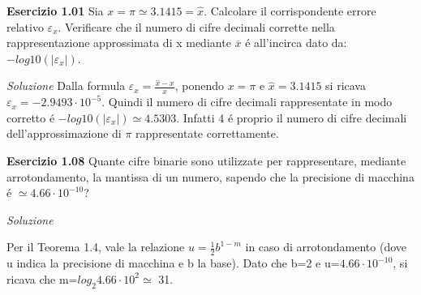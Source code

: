 \documentclass[20pt,a4paper]{book}
\begin{document}
 
\textbf{\Large{Esercizio 1.01}}
Sia \begin{math}{x=\pi\simeq 3.1415=\widehat{x}}\end{math}. Calcolare il corrispondente errore
relativo \begin{math}{\varepsilon_{x}}\end{math}. Verificare che il numero di cifre decimali 
corrette nella rappresentazione approssimata di x mediante \begin{math}{\overline{x}}\end{math}
\'e all'incirca dato da: \begin{math}{-log10(|\varepsilon_{x}|)}\end{math}.

\textit{Soluzione}
Dalla formula \begin{math}{\varepsilon_{x}=\frac{\widehat{x}-x}{x}}\end{math}, ponendo \begin{math}
{x=\pi}\end{math} e \begin{math}{\widehat{x}=3.1415}\end{math} si ricava \begin{math}{\varepsilon_{x}=
-2.9493\cdot10^{-5}}\end{math}. Quindi il numero di cifre decimali rappresentate in modo corretto \'e \begin{math}{-log10(|\varepsilon_{x}|)\simeq 4.5303}\end{math}. 
Infatti 4 \'e proprio il numero di cifre decimali dell'approssimazione di \begin{math}{\pi}\end{math} rappresentate correttamente.

 
\vspace{10mm}

\textbf{\Large{Esercizio 1.08}}
Quante cifre binarie sono utilizzate per rappresentare, mediante 
arrotondamento, la mantissa di un numero, sapendo che la precisione
di macchina \'e \begin{math}\simeq  4.66\cdot10 ^{-10}\end{math}?

\textit{Soluzione} 

Per il Teorema 1.4, vale la relazione \begin{math} u=\frac{1}{2}b^{1-m} \end{math}
in caso di arrotondamento (dove u indica la precisione di macchina e b la base). 
Dato che b=2 e u=\begin{math}4.66\cdot10 ^{-10}\end{math}, si ricava che 
m=\begin{math}log_2 4.66\cdot10 ^{2}\simeq\end{math} 31.
\end{document}
